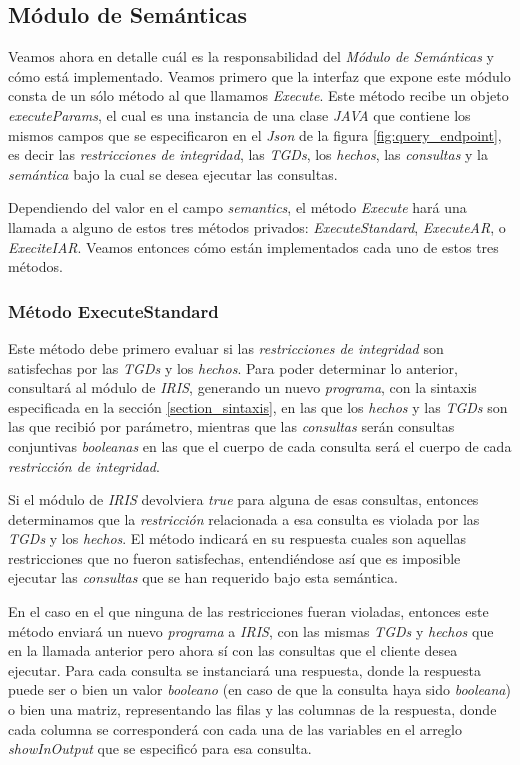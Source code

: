 \documentclass[11pt,a4paper,twoside]{tesis}
\begin{document}
\subsection{Módulo de Semánticas}

Veamos ahora en detalle cuál es la responsabilidad del \textit{Módulo de Semánticas} y cómo está implementado. Veamos primero que la interfaz que expone este módulo consta de un sólo método al que llamamos \textit{Execute}. Este método recibe un objeto \textit{executeParams}, el cual es una instancia de una clase \textit{JAVA} que contiene los mismos campos que se especificaron en el \textit{Json} de la figura \ref{fig:query_endpoint}, es decir las \textit{restricciones de integridad}, las \textit{TGDs}, los \textit{hechos}, las \textit{consultas} y la \textit{semántica} bajo la cual se desea ejecutar las consultas.

Dependiendo del valor en el campo \textit{semantics}, el método \textit{Execute} hará una llamada a alguno de estos tres métodos privados: \textit{ExecuteStandard}, \textit{ExecuteAR}, o \textit{ExeciteIAR}. Veamos entonces cómo están implementados cada uno de estos tres métodos.

\subsubsection{Método ExecuteStandard}


Este método debe primero evaluar si las \textit{restricciones de integridad} son satisfechas por las \textit{TGDs} y los \textit{hechos}. Para poder determinar lo anterior, consultará al módulo de \textit{IRIS}, generando un nuevo \textit{programa}, con la sintaxis especificada en la sección \ref{section_sintaxis}, en las que los \textit{hechos} y las \textit{TGDs} son las que recibió por parámetro, mientras que las \textit{consultas} serán consultas conjuntivas \textit{booleanas} en las que el cuerpo de cada consulta será el cuerpo de cada \textit{restricción de integridad}. 

Si el módulo de \textit{IRIS} devolviera \textit{true} para alguna de esas consultas, entonces determinamos que la \textit{restricción} relacionada a esa consulta es violada por las \textit{TGDs} y los \textit{hechos}. El método indicará en su respuesta cuales son aquellas restricciones que no fueron satisfechas, entendiéndose así que es imposible ejecutar las \textit{consultas} que se han requerido bajo esta semántica.

En el caso en el que ninguna de las restricciones fueran violadas, entonces este método enviará un nuevo \textit{programa} a \textit{IRIS}, con las mismas \textit{TGDs} y \textit{hechos} que en la llamada anterior pero ahora sí con las consultas que el cliente desea ejecutar. Para cada consulta se instanciará una respuesta, donde la respuesta puede ser o bien un valor \textit{booleano} (en caso de que la consulta haya sido \textit{booleana}) o bien una matriz, representando las filas y las columnas de la respuesta, donde cada columna se corresponderá con cada una de las variables en el arreglo \textit{showInOutput} que se especificó para esa consulta.
\end{document}
